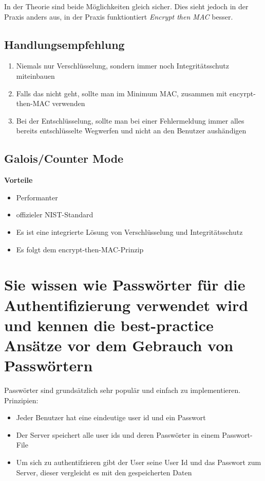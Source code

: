 \documentclass{report}
\theoremstyle{definition}
\theoremstyle{example}
\begin{document}
In der Theorie sind beide Möglichkeiten gleich sicher. Dies sieht jedoch in der Praxis anders aus, in der Praxis funktiontiert \textit{Encrypt then MAC} besser. 

	\subsection{Handlungsempfehlung}
\begin{enumerate}
	\item Niemals nur Verschlüsselung, sondern immer noch Integritätsschutz miteinbauen
	\item Falls das nicht geht, sollte man im Minimum MAC, zusammen mit encyrpt-then-MAC verwenden
	\item Bei der Entschlüsselung, sollte man bei einer Fehlermeldung immer alles bereits entschlüsselte Wegwerfen und nicht an den Benutzer aushändigen
\end{enumerate}

	\subsection{Galois/Counter Mode}
	\textbf{Vorteile}
	\begin{itemize}
		\item Performanter
		\item offizieler NIST-Standard
		\item Es ist eine integrierte Lösung von Verschlüsselung und Integritätsschutz
		\item Es folgt dem encrypt-then-MAC-Prinzip
	\end{itemize}

\section{Sie wissen wie Passwörter für die Authentifizierung verwendet wird und kennen die best-practice Ansätze vor dem Gebrauch von Passwörtern}
Passwörter sind grundsätzlich sehr populär und einfach zu implementieren.\\

Prinzipien:\\
\begin{itemize}
	\item Jeder Benutzer hat eine eindeutige user id und ein Passwort
	\item Der Server speichert alle user ids und deren Passwörter in einem Passwort-File
	\item Um sich zu authentifzieren gibt der User seine User Id und das Passwort zum Server, dieser vergleicht es mit den gespeicherten Daten
\end{itemize}
\end{document}
